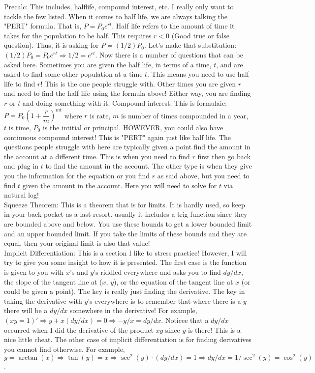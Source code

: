 \documentclass[10pt]{article}
\theoremstyle{Theorem}
\theoremstyle{definition}
\theoremstyle{remark}
\theoremstyle{custom}
\begin{document}
Precalc: This includes, halflife, compound interest, etc. I really only want to tackle the few listed. When it comes to half life, we are always talking the "PERT" formula. That is, $P=P_0e^{rt}$. Half life refers to the amount of time it takes for the population to be half. This requires $r<0$ (Good true or false question). Thus, it is asking for $P=(1/2)P_0$. Let's make that substitution: $(1/2)P_0=P_0e^{rt} \Rightarrow 1/2=e^{rt}$. Now there is a number of questions that can be asked here. Sometimes you are given the half life, in terms of a time, $t$, and are asked to find some other population at a time $t$. This means you need to use half life to find $r$! This is the one people struggle with. Other times you are given $r$ and need to find the half life using the formula above! Either way, you are finding $r$ or $t$ and doing something with it.
\newpage
\noindent Compound interest: This is formulaic: $P=P_0\left(1+\dfrac{r}{m}\right)^{mt}$ where $r$ is rate, $m$ is number of times compounded in a year, $t$ is time, $P_0$ is the intitial or principal.  HOWEVER, you could also have continuous compound interest! This is "PERT" again just like half life. The questions people struggle with here are typically given a point find the amount in the account at a different time. This is when you need to find $r$ first then go back and plug in $t$ to find the amount in the account. The other type is when they give you the information for the equation or you find $r$ as said above, but you need to find $t$ given the amount in the account. Here you will need to solve for $t$ via natural log! \\
Squeeze Theorem: This is a theorem that is for limits. It is hardly used, so keep in your back pocket as a last resort. usually it includes a trig function since they are bounded above and below. You use these bounds to get a lower bounded limit and an upper bounded limit. If you take the limits of these bounds and they are equal, then your original limit is also that value! \\
Implicit Differentiation: This is a section I like to stress practice! However, I will try to give you some insight to how it is presented. The first case is the function is given to you with $x$'s and $y$'s riddled everywhere and asks you to find $dy/dx$, the slope of the tangent line at ($x$, $y$), or the equation of the tangent line at $x$ (or could be given a point). The key is really just finding the derivative. The key in taking the derivative with $y$'s everywhere is to remember that where there is a $y$ there will be a $dy/dx$ somewhere in the derivative! For example, $(xy=1)'\Rightarrow y+x(dy/dx)=0 \Rightarrow -y/x=dy/dx$. Noticee that a $dy/dx$ occurred when I did the derivative of the product $xy$ since $y$ is there! This is a nice little cheat. The other case of implicit differentiation is for finding derivatives you cannot find otherwise. For example, $y=\arctan(x) \Rightarrow \tan(y)=x \Rightarrow \sec^2(y)\cdot (dy/dx)=1 \Rightarrow dy/dx=1/\sec^2(y)=\cos^2(y)$.\\
\end{document}
